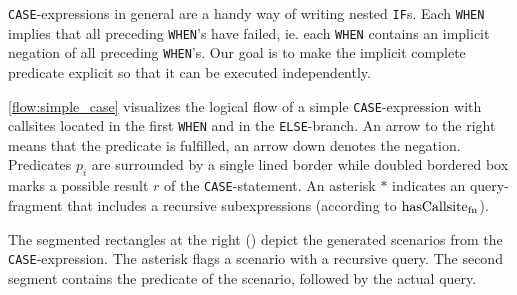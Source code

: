 \texttt{CASE}-expressions in general are a handy way of writing nested \texttt{IF}s. Each \texttt{WHEN} implies that all preceding \texttt{WHEN}'s have failed, ie. each \texttt{WHEN} contains an implicit negation of all preceding \texttt{WHEN}'s. Our goal is to make the implicit complete predicate explicit so that it can be executed independently.

\autoref{flow:simple_case} visualizes the logical flow of a simple \texttt{CASE}-expression with callsites located in the first \texttt{WHEN} and in the \texttt{ELSE}-branch. An arrow to the right means that the predicate is fulfilled, an arrow down denotes the negation. Predicates $p_i$ are surrounded by a single lined border while doubled bordered box marks a possible result $r$ of the \texttt{CASE}-statement. An asterisk $\ast$ indicates an query-fragment that includes a recursive subexpressions (according to $\operatorname{\text{hasCallsite}_{fn}}$).

The segmented rectangles at the right (\label{scenarios:simple_case}) depict the generated scenarios from the \texttt{CASE}-expression. The asterisk flags a scenario with a recursive query. The second segment contains the predicate of the scenario, followed by the actual query.

